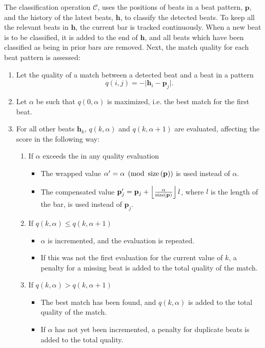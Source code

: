 The classification operation $\mathcal{C}$,
uses the positions of beats in a beat pattern, $\mathbf{p}$,
and the history of the latest beats, $\mathbf{h}$,
to classify the detected beats.
To keep all the relevant beats in $\mathbf{h}$,
the current bar is tracked continuously.
When a new beat is to be classified,
it is added to the end of $\mathbf{h}$,
and all beats which have been classified
as being in prior bars are removed.
Next, the match quality for each beat pattern is assessed:
\begin{enumerate}
\item Let the quality of a match between a detected beat
and a beat in a pattern
\begin{equation}
q(i, j) = -\vert \mathbf{h}_i - \mathbf{p}_j \vert.
\end{equation}

\item Let $\alpha$ be such that $q(0, \alpha)$ is maximized,
i.e. the best match for the first beat.

\item For all other beats $\mathbf{h}_k$,
$q(k, \alpha)$ and $q(k, \alpha + 1)$ are evaluated,
affecting the score in the following way:
\begin{enumerate}
\item If $\alpha$ exceeds the  in any quality evaluation
\begin{itemize}
\item The wrapped value $\alpha' = \alpha \pmod {\operatorname{size} \left( \mathbf{p} \right)}$ is used instead of $\alpha$.
\item The compensated value
$\mathbf{p}_j' = \mathbf{p}_j +
\left \lfloor
\frac{\alpha}{\operatorname{size} \left( \mathbf{p} \right)}
\right \rfloor l$,
where $l$ is the length of the bar,
is used instead of $\mathbf{p}_j$.
\end{itemize}

\item If $q(k, \alpha) \leq q(k, \alpha + 1)$
\begin{itemize}
\item $\alpha$ is incremented, and the evaluation is repeated.
\item If this was not the first evaluation for the current value of $k$,
a penalty for a missing beat is added to the total quality of the match.
\end{itemize}

\item If $q(k, \alpha) > q(k, \alpha + 1)$
\begin{itemize}
\item The best match has been found,
and $q(k, \alpha)$ is added to the total quality of the match.
\item If $\alpha$ has not yet been incremented,
a penalty for duplicate beats is added to the total quality.
\end{itemize}
\end{enumerate}
\end{enumerate}

